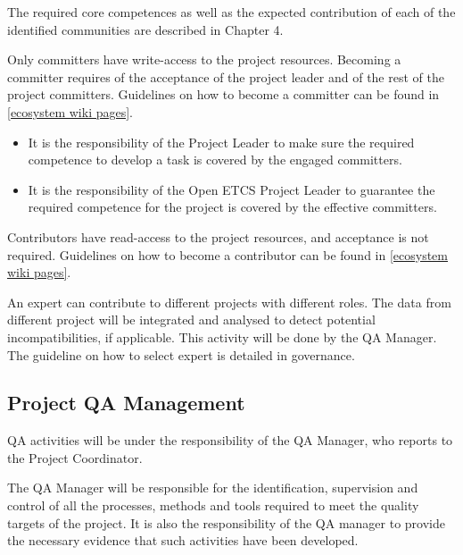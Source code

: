 \documentclass{template/openetcs_article}
\begin{document}
The required core competences as well as the expected contribution of each of the identified communities are described in Chapter 4.

Only committers have write-access to the project resources. Becoming a committer requires of the acceptance of the project leader and of the rest of the project committers. Guidelines on how to become a committer can be found in \href{https://github.com/openETCS/ecosystem/wiki/_pages}{[ecosystem wiki pages]}.

\begin{itemize}
\item It is the responsibility of the Project Leader to make sure the required competence to develop a task is covered by the engaged committers.
\item It is the responsibility of the Open \gls{ETCS} Project Leader to guarantee the required competence for the project is covered by the effective committers.
\end{itemize}

Contributors have read-access to the project resources, and acceptance is not required. Guidelines on how to become a contributor can be found in \href{https://github.com/openETCS/ecosystem/wiki/_pages}{[ecosystem wiki pages]}.

An expert can contribute to different projects with different roles. The data from different project will be integrated and analysed to detect potential incompatibilities, if applicable. This activity will be done by the QA Manager. The guideline on how to select expert is detailed in governance.


\subsection{Project QA Management}
QA activities will be under the responsibility of the QA Manager, who reports to the Project Coordinator.

The QA Manager will be responsible for the identification, supervision and control of all the processes, methods and tools required to meet the quality targets of the project. It is also the responsibility of the QA manager to provide the necessary evidence that such activities have been developed.
\end{document}

